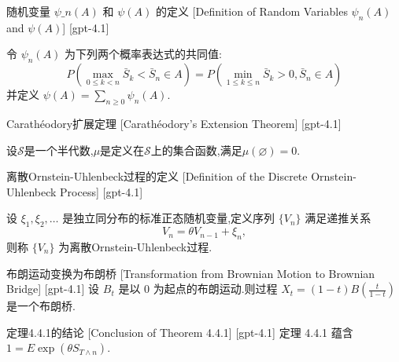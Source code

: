 \documentclass[UTF8]{ctexart}
\begin{document}
    
    
    \begin{dfn}
        {随机变量 $\psi\_{n}(A)$ 和 $\psi(A)$ 的定义}
        [Definition of Random Variables $\psi_{n}(A)$ and $\psi(A)$]
        [gpt-4.1]
        
令 $\psi_{n}(A)$ 为下列两个概率表达式的共同值:
\[
P\left(\max_{0 \leq k < n} \bar{S}_{k} < \bar{S}_{n} \in A\right) = P\left(\min_{1 \leq k \leq n} \bar{S}_{k} > 0, \bar{S}_{n} \in A\right)
\]
并定义 $\psi(A) = \sum_{n \geq 0} \psi_{n}(A)$.

    \end{dfn}
    
    
    
    \begin{thm}
        {Carathéodory扩展定理}
        [Carathéodory's Extension Theorem]
        [gpt-4.1]
        
设$\boldsymbol{\mathcal{S}}$是一个半代数,$\mu$是定义在$\boldsymbol{\mathcal{S}}$上的集合函数,满足$\mu(\varnothing) = 0$.

    \end{thm}
    
    
    
    \begin{dfn}
        {离散Ornstein-Uhlenbeck过程的定义}
        [Definition of the Discrete Ornstein-Uhlenbeck Process]
        [gpt-4.1]
        
设 $\xi_1, \xi_2, \ldots$ 是独立同分布的标准正态随机变量,定义序列 $\{V_n\}$ 满足递推关系
\[
V_n = \theta V_{n-1} + \xi_n,
\]
则称 $\{V_n\}$ 为离散Ornstein-Uhlenbeck过程.

    \end{dfn}
    
    
    
    \begin{thm}
        {布朗运动变换为布朗桥}
        [Transformation from Brownian Motion to Brownian Bridge]
        [gpt-4.1]
        设 $B_t$ 是以 0 为起点的布朗运动.则过程 $X_t = (1-t) B\left(\frac{t}{1-t}\right)$ 是一个布朗桥.
    \end{thm}
    
    
    
    \begin{thm}
        {定理4.4.1的结论}
        [Conclusion of Theorem 4.4.1]
        [gpt-4.1]
        定理 4.4.1 蕴含 $1 = E \exp(\theta S_{T \wedge n})$.
    \end{thm}
    
\end{document}
